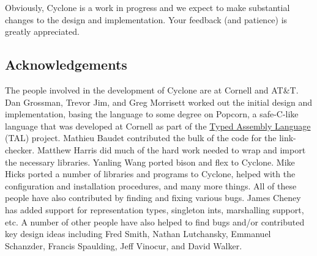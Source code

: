 Obviously, Cyclone is a work in progress and we expect to make
substantial changes to the design and implementation.  Your feedback
(and patience) is greatly appreciated.

\subsection{Acknowledgements}

The people involved in the development of Cyclone are at Cornell and
AT\&T\@.  Dan Grossman, Trevor Jim, and Greg Morrisett worked out the
initial design and implementation, basing the language to some degree
on Popcorn, a safe-C-like language that was developed at Cornell as
part of the
\href{http://www.cs.cornell.edu/talc}{Typed Assembly Language} (TAL)
project.  Mathieu Baudet contributed the bulk of the code for the
link-checker.  Matthew Harris did much of the hard work needed to
wrap and import the necessary libraries.  Yanling Wang ported bison and
flex to Cyclone.  Mike Hicks ported a number of libraries and programs
to Cyclone, helped with the configuration and installation procedures,
and many more things.  All of these people have also contributed by finding
and fixing various bugs.  James Cheney has added support for 
representation types, singleton ints, marshalling support, etc.
A number of other people have also helped
to find bugs and/or contributed key design ideas including 
Fred Smith, Nathan Lutchansky, Emmanuel Schanzder, Francis Spaulding,
Jeff Vinocur, and David Walker.  

